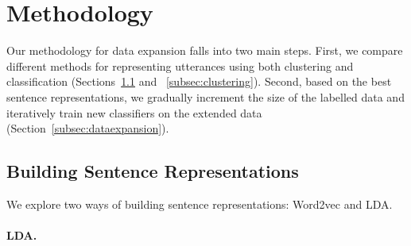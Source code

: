 \documentclass[11pt]{article}
\begin{document}
\section{Methodology}
\label{sec:methodology}

Our methodology for data expansion falls into two main steps. First, we compare different methods for representing utterances using both clustering and classification (Sections~\ref{subsec:sentencerepresentations} and ~\ref{subsec:clustering}). Second, based on the best sentence representations, we gradually increment the size of the labelled data and iteratively train new classifiers on the extended data (Section~\ref{subsec:dataexpansion}). 






\subsection{Building Sentence Representations}
\label{subsec:sentencerepresentations}
We explore two ways of building sentence representations: Word2vec and LDA. %


\paragraph{LDA.}
\end{document}
